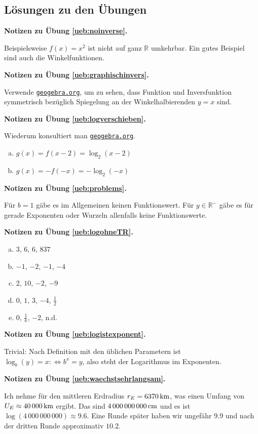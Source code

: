 \documentclass[%
11pt,%
twoside,%
titlepage,%
german,%
headsepline%
]{scrartcl}
\newcommand{\geogebralink}{\href{https://www.geogebra.org/calculator}{\texttt{geogebra.org}}}
\newcommand{\concatueb}[1]{ueb:#1}%
\newcommand{\concatlsg}[1]{lsg:#1}%
\newenvironment{lsg}[1]{%
    \par\noindent\textbf{Notizen zu Übung \ref{\concatueb{#1}}.}%
    \label{\concatlsg{#1}}
}{%
    \par%
}
\begin{document}
\clearpage

\subsection{Lösungen zu den Übungen}

\begin{lsg}{noinverse}
    Beispielsweise $f(x)=x^2$ ist nicht auf ganz $\mathbb{R}$ umkehrbar. Ein gutes Beispiel sind auch die Winkelfunktionen.
\end{lsg}
\begin{lsg}{graphischinvers}
    Verwende \geogebralink, um zu sehen, dass Funktion und Inversfunktion symmetrisch bezüglich Spiegelung an der Winkelhalbierenden $y=x$ sind.
\end{lsg}
\begin{lsg}{logverschieben}
Wiederum konsultiert man \geogebralink.
    \begin{enumerate}[a)]
        \item $g(x)=f(x-2)=\log_2(x-2)$
        \item $g(x)=-f(-x)=-\log_2(-x)$
    \end{enumerate}
\end{lsg}
\begin{lsg}{problems}
    Für $b=1$ gäbe es im Allgemeinen keinen Funktionswert. Für $y\in\mathbb{R}^-$ gäbe es für gerade Exponenten oder Wurzeln allenfalls keine Funktionswerte.
\end{lsg}
\begin{lsg}{logohneTR}
    \begin{enumerate}[a)]
        \item $3$, $6$, $6$, $837$
        \item $-1$, $-2$, $-1$, $-4$
        \item $2$, $10$, $-2$, $-9$
        \item $0$, $1$, $3$, $-4$, $\frac{1}{2}$
        \item $0$, $\frac{1}{k}$, $-2$, n.d.
    \end{enumerate}
\end{lsg}
\begin{lsg}{logistexponent}
    Trivial: Nach Definition mit den üblichen Parametern ist $\log_b(y)=x :\Leftrightarrow b^x=y$, also steht der Logarithmus im Exponenten.
\end{lsg}
\begin{lsg}{waechstsehrlangsam}
    Ich nehme für den mittleren Erdradius $r_E=\unit[6370]{km}$, was einen Umfang von $U_E\approx\unit[40\,000]{km}$ ergibt. Das sind $\unit[4\,000\,000\,000]{cm}$ und es ist $\log(4\,000\,000\,000)\approx9.6$. Eine Runde später haben wir ungefähr $9.9$ und nach der dritten Runde approximativ $10.2$.
\end{lsg}
\end{document}
